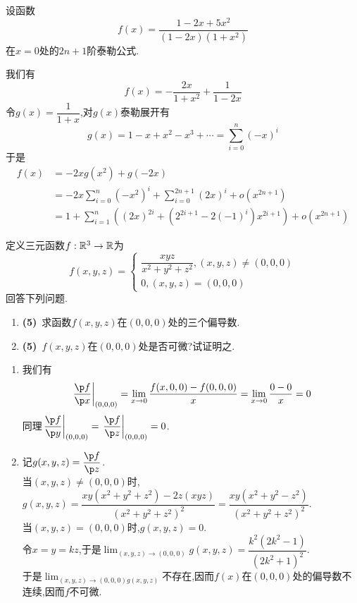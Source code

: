 \documentclass{ctexart}
\begin{document}
\begin{problem}[3.(15\songti{分})]
    设函数\[f(x)=\dfrac{1-2x+5x^2}{(1-2x)(1+x^2)}\]在$x=0$处的$2n+1$阶泰勒公式.
\end{problem}
\begin{solution}
    我们有\[f(x)=-\dfrac{2x}{1+x^2}+\dfrac{1}{1-2x}\]
    令$g(x)=\dfrac{1}{1+x}$,对$g(x)$泰勒展开有
    \[g(x)=1-x+x^2-x^3+\cdots=\sum_{i=0}^{n}(-x)^i\]
    于是
    \[\begin{aligned}
        f(x)
        &= -2xg(x^2)+g(-2x) \\
        &= -2x\sum_{i=0}^{n}(-x^2)^i+\sum_{i=0}^{2n+1}(2x)^i+o(x^{2n+1}) \\
        &= 1+\sum_{i=1}^{n}\left((2x)^{2i}+(2^{2i+1}-2(-1)^i)x^{2i+1}\right)+o(x^{2n+1})
    \end{aligned}\]
\end{solution}
\begin{problem}[4.(10\songti{分})]
    定义三元函数$f:\mathbb{R}^3\to\mathbb{R}$为\[f(x,y,z)=\left\{\begin{array}{l}
        \dfrac{xyz}{x^2+y^2+z^2},(x,y,z)\neq(0,0,0)\\
        0,(x,y,z)=(0,0,0)
    \end{array}\right.\]回答下列问题.
    \begin{enumerate}[label=\textbf{(\arabic*)},leftmargin=*]
        \item \textbf{(5)}\ 求函数$f(x,y,z)$在$(0,0,0)$处的三个偏导数.
        \item \textbf{(5)}\ $f(x,y,z)$在$(0,0,0)$处是否可微?试证明之.
    \end{enumerate}
\end{problem}
\begin{solution}
    \begin{enumerate}[label=\textbf{(\arabic*)},leftmargin=*]
        \item 我们有
            \[\left.\dfrac{\p f}{\p x}\right|_{(0,0,0)}=\lim_{x\to0}\dfrac{f(x,0,0)-f(0,0,0)}{x}=\lim_{x\to0}\dfrac{0-0}{x}=0\]
            同理$\left.\dfrac{\p f}{\p y}\right|_{(0,0,0)}=\left.\dfrac{\p f}{\p z}\right|_{(0,0,0)}=0$.
        \item 记$g(x,y,z)=\dfrac{\p f}{\p z}$.\\
            当$(x,y,z)\neq(0,0,0)$时,$g(x,y,z)=\dfrac{xy(x^2+y^2+z^2)-2z(xyz)}{(x^2+y^2+z^2)^2}=\dfrac{xy(x^2+y^2-z^2)}{(x^2+y^2+z^2)^2}$.\\
            当$(x,y,z)=(0,0,0)$时,$g(x,y,z)=0$.\\
            令$x=y=kz$,于是$\displaystyle\lim_{(x,y,z)\to(0,0,0)}g(x,y,z)=\dfrac{k^2(2k^2-1)}{(2k^2+1)^2}$.\\
            于是$\displaystyle\lim_{(x,y,z)\to(0,0,0)g(x,y,z)}$不存在,因而$f(x)$在$(0,0,0)$处的偏导数不连续,因而$f$不可微.
    \end{enumerate}
\end{solution}
\end{document}
